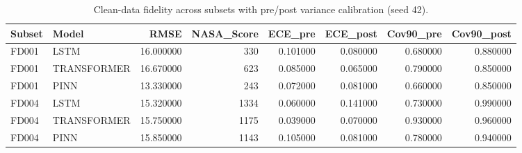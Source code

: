 \begin{table}
\caption{Clean-data fidelity across subsets with pre/post variance calibration (seed 42).}
\label{tab:A_baselines}
\begin{tabular}{llrrrrrr}
\toprule
Subset & Model & RMSE & NASA_Score & ECE_pre & ECE_post & Cov90_pre & Cov90_post \\
\midrule
FD001 & LSTM & 16.000000 & 330 & 0.101000 & 0.080000 & 0.680000 & 0.880000 \\
FD001 & TRANSFORMER & 16.670000 & 623 & 0.085000 & 0.065000 & 0.790000 & 0.850000 \\
FD001 & PINN & 13.330000 & 243 & 0.072000 & 0.081000 & 0.660000 & 0.850000 \\
FD004 & LSTM & 15.320000 & 1334 & 0.060000 & 0.141000 & 0.730000 & 0.990000 \\
FD004 & TRANSFORMER & 15.750000 & 1175 & 0.039000 & 0.070000 & 0.930000 & 0.960000 \\
FD004 & PINN & 15.850000 & 1143 & 0.105000 & 0.081000 & 0.780000 & 0.940000 \\
\bottomrule
\end{tabular}
\end{table}
